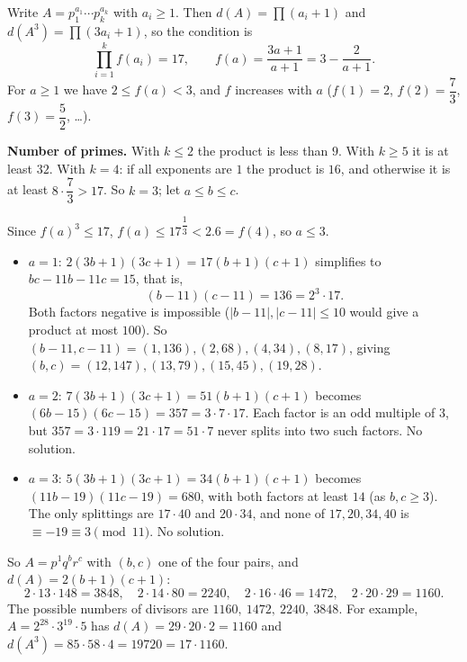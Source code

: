 Write $A=p_1^{a_1}\cdots p_k^{a_k}$ with $a_i\ge1$. Then $d(A)=\prod(a_i+1)$ and $d(A^3)=\prod(3a_i+1)$, so the condition is
\[
\prod_{i=1}^{k}f(a_i)=17,\qquad f(a)=\dfrac{3a+1}{a+1}=3-\dfrac{2}{a+1}.
\]
For $a\ge1$ we have $2\le f(a)<3$, and $f$ increases with $a$ ($f(1)=2$, $f(2)=\dfrac{7}{3}$, $f(3)=\dfrac{5}{2}$, \dots).

\textbf{Number of primes.} With $k\le2$ the product is less than $9$. With $k\ge5$ it is at least $32$. With $k=4$: if all exponents are $1$ the product is $16$, and otherwise it is at least $8\cdot\dfrac{7}{3}>17$. So $k=3$; let $a\le b\le c$.

Since $f(a)^3\le17$, $f(a)\le17^{\dfrac{1}{3}}<2.6=f(4)$, so $a\le3$.
\begin{itemize}
\item $a=1$: $2(3b+1)(3c+1)=17(b+1)(c+1)$ simplifies to $bc-11b-11c=15$, that is,
\[
(b-11)(c-11)=136=2^3\cdot17 .
\]
Both factors negative is impossible ($|b-11|,|c-11|\le10$ would give a product at most $100$). So $(b-11,c-11)=(1,136),(2,68),(4,34),(8,17)$, giving $(b,c)=(12,147),(13,79),(15,45),(19,28)$.
\item $a=2$: $7(3b+1)(3c+1)=51(b+1)(c+1)$ becomes $(6b-15)(6c-15)=357=3\cdot7\cdot17$. Each factor is an odd multiple of $3$, but $357=3\cdot119=21\cdot17=51\cdot7$ never splits into two such factors. No solution.
\item $a=3$: $5(3b+1)(3c+1)=34(b+1)(c+1)$ becomes $(11b-19)(11c-19)=680$, with both factors at least $14$ (as $b,c\ge3$). The only splittings are $17\cdot40$ and $20\cdot34$, and none of $17,20,34,40$ is $\equiv-19\equiv3\pmod{11}$. No solution.
\end{itemize}
So $A=p^{1}q^{b}r^{c}$ with $(b,c)$ one of the four pairs, and $d(A)=2(b+1)(c+1)$:
\[
2\cdot13\cdot148=3848,\quad 2\cdot14\cdot80=2240,\quad 2\cdot16\cdot46=1472,\quad 2\cdot20\cdot29=1160 .
\]
The possible numbers of divisors are $\boxed{1160,\ 1472,\ 2240,\ 3848}$. For example, $A=2^{28}\cdot3^{19}\cdot5$ has $d(A)=29\cdot20\cdot2=1160$ and $d(A^3)=85\cdot58\cdot4=19720=17\cdot1160$.
